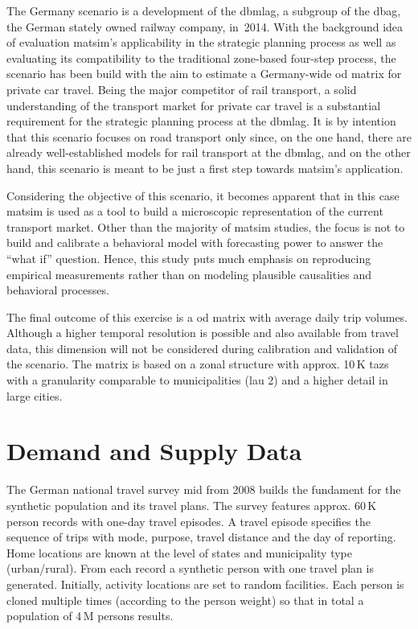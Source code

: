 The Germany scenario is a development of the \gls{dbmlag}, a subgroup of the \gls{dbag}, the German stately owned railway company, in~2014. With the background idea of evaluation \gls{matsim}'s applicability in the strategic planning process as well as evaluating its compatibility to the traditional zone-based four-step process, the scenario has been build with the aim to estimate a Germany-wide \gls{od} matrix for private car travel. Being the major competitor of rail transport, a solid understanding of the transport market for private car travel is a substantial requirement for the strategic planning process at the \gls{dbmlag}. It is by intention that this scenario focuses on road transport only since, on the one hand, there are already well-established models for rail transport at the \gls{dbmlag}, and on the other hand, this scenario is meant to be just a first step towards \gls{matsim}'s application.

Considering the objective of this scenario, it becomes apparent that in this case \gls{matsim} is used as a tool to build a microscopic representation of the current transport market. Other than the majority of \gls{matsim} studies, the focus is not to build and calibrate a behavioral model with forecasting power to answer the ``what if'' question. Hence, this study puts much emphasis on reproducing empirical measurements rather than on modeling plausible causalities and behavioral processes.

The final outcome of this exercise is a \gls{od} matrix with average daily trip volumes. Although a higher temporal resolution is possible and also available from travel data, this dimension will not be considered during calibration and validation of the scenario. The matrix is based on a zonal structure with approx. 10\,K \glspl{taz} with a granularity comparable to municipalities (\gls{lau} 2) and a higher detail in large cities.

\section{Demand and Supply Data}

The German national travel survey \gls{mid} from 2008 \citep{Follmer2010MiD} builds the fundament for the synthetic population and its travel plans. The survey features approx. 60\,K person records with one-day travel episodes. A travel episode specifies the sequence of trips with mode, purpose, travel distance and the day of reporting. Home locations are known at the level of states and municipality type (urban/rural). From each record a synthetic person with one travel plan is generated. Initially, activity locations are set to random facilities. Each person is cloned multiple times (according to the person weight) so that in total a population of 4\,M persons results.

